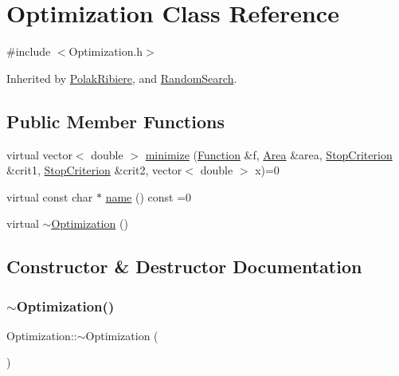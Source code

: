 \hypertarget{class_optimization}{}\section{Optimization Class Reference}
\label{class_optimization}


{\ttfamily \#include $<$Optimization.\+h$>$}



Inherited by \hyperlink{class_polak_ribiere}{Polak\+Ribiere}, and \hyperlink{class_random_search}{Random\+Search}.

\subsection*{Public Member Functions}
\begin{DoxyCompactItemize}
\item 
virtual vector$<$ double $>$ \hyperlink{class_optimization_a48d9f3c2014da553156c4adf17f935d7}{minimize} (\hyperlink{class_function}{Function} \&f, \hyperlink{class_area}{Area} \&area, \hyperlink{class_stop_criterion}{Stop\+Criterion} \&crit1, \hyperlink{class_stop_criterion}{Stop\+Criterion} \&crit2, vector$<$ double $>$ x)=0
\item 
virtual const char $\ast$ \hyperlink{class_optimization_a75a9fc5b451bbe5dd3eae14a12e5fbae}{name} () const =0
\item 
virtual \hyperlink{class_optimization_ab31ce5bff6ce62836b5cdb346cf5a36a}{$\sim$\+Optimization} ()
\end{DoxyCompactItemize}


\subsection{Constructor \& Destructor Documentation}
\mbox{\label{class_optimization_ab31ce5bff6ce62836b5cdb346cf5a36a}} 
\subsubsection{\texorpdfstring{$\sim$\+Optimization()}{~Optimization()}}
{\footnotesize\ttfamily Optimization\+::$\sim$\+Optimization (\begin{DoxyParamCaption}{ }\end{DoxyParamCaption})\hspace{0.3cm}{\ttfamily [virtual]}}

